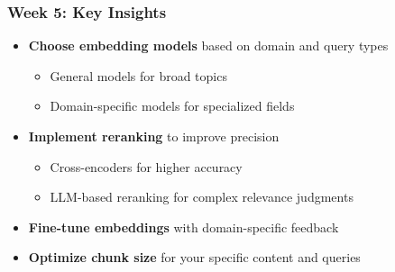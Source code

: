 \begin{frame}
    \frametitle{Week 5: Key Insights}
    
    \begin{center}
    \end{center}
    
    \begin{itemize}
        \item \textbf{Choose embedding models} based on domain and query types
        \begin{itemize}
            \item General models for broad topics
            \item Domain-specific models for specialized fields
        \end{itemize}
        \item \textbf{Implement reranking} to improve precision
        \begin{itemize}
            \item Cross-encoders for higher accuracy
            \item LLM-based reranking for complex relevance judgments
        \end{itemize}
        \item \textbf{Fine-tune embeddings} with domain-specific feedback
        \item \textbf{Optimize chunk size} for your specific content and queries
    \end{itemize}
    
    \begin{center}
    \end{center}
\end{frame} 